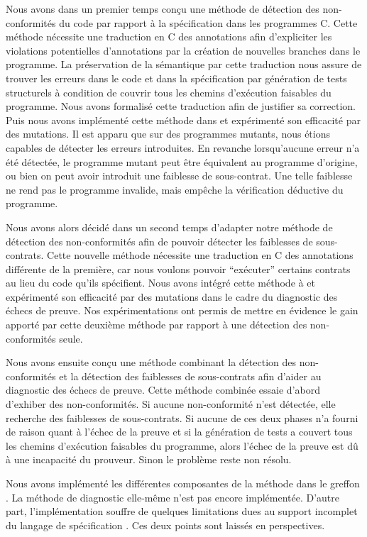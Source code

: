Nous avons dans un premier temps conçu une méthode de détection des
non-conformités du code par rapport à la spécification dans les programmes C.
Cette méthode nécessite une traduction en C des annotations \eacsl afin
d'expliciter les violations potentielles d'annotations par la création de
nouvelles branches dans le programme.
La préservation de la sémantique par cette traduction nous assure de trouver
les erreurs dans le code et dans la spécification par génération de tests
structurels à condition de couvrir tous les chemins d'exécution faisables du
programme.
Nous avons formalisé cette traduction afin de justifier sa correction.
Puis nous avons implémenté cette méthode dans \stady et expérimenté son
efficacité par des mutations.
Il est apparu que sur des programmes mutants, nous étions capables de détecter
les erreurs introduites.
En revanche lorsqu'aucune erreur n'a été détectée, le programme mutant peut
être équivalent au programme d'origine, ou bien on peut avoir introduit une
faiblesse de sous-contrat.
Une telle faiblesse ne rend pas le programme invalide, mais empêche la
vérification déductive du programme.

Nous avons alors décidé dans un second temps d'adapter notre méthode de
détection des non-conformités afin de pouvoir détecter les faiblesses de
sous-contrats.
Cette nouvelle méthode nécessite une traduction en C des annotations \eacsl
différente de la première, car nous voulons pouvoir ``exécuter'' certains
contrats au lieu du code qu'ils spécifient.
Nous avons intégré cette méthode à \stady et expérimenté son efficacité par des
mutations dans le cadre du diagnostic des échecs de preuve.
Nos expérimentations ont permis de mettre en évidence le gain apporté par cette
deuxième méthode par rapport à une détection des non-conformités seule.

Nous avons ensuite conçu une méthode combinant la détection des non-conformités
et la détection des faiblesses de sous-contrats afin d'aider au diagnostic des
échecs de preuve.
Cette méthode combinée essaie d'abord d'exhiber des non-conformités.
Si aucune non-conformité n'est détectée, elle recherche des faiblesses de
sous-contrats.
Si aucune de ces deux phases n'a fourni de raison quant à l'échec de la preuve
et si la génération de tests a couvert tous les chemins d'exécution faisables
du programme, alors l'échec de la preuve est dû à une incapacité du prouveur.
Sinon le problème reste non résolu.

Nous avons implémenté les différentes composantes de la méthode dans le
greffon \stady.
La méthode de diagnostic elle-même n'est pas encore implémentée.
D'autre part, l'implémentation souffre de quelques limitations dues au support
incomplet du langage de spécification \eacsl.
Ces deux points sont laissés en perspectives.

